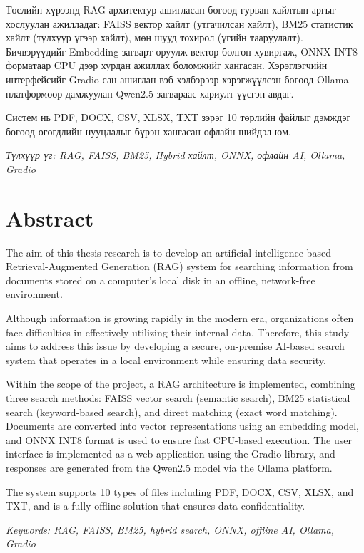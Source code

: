 \documentclass[11pt,a4paper]{article}
\begin{document}
Төслийн хүрээнд RAG архитектур ашигласан бөгөөд гурван хайлтын аргыг хослуулан ажилладаг: FAISS вектор хайлт (утгачилсан хайлт), BM25 статистик хайлт (түлхүүр үгээр хайлт), мөн шууд тохирол (үгийн тааруулалт). Бичвэрүүдийг Embedding загварт оруулж вектор болгон хувиргаж, ONNX INT8 форматаар CPU дээр хурдан ажиллах боломжийг хангасан. Хэрэглэгчийн интерфейсийг Gradio сан ашиглан вэб хэлбэрээр хэрэгжүүлсэн бөгөөд Ollama платформоор дамжуулан Qwen2.5 загвараас хариулт үүсгэн авдаг.

Систем нь PDF, DOCX, CSV, XLSX, TXT зэрэг 10 төрлийн файлыг дэмждэг бөгөөд өгөгдлийн нууцлалыг бүрэн хангасан офлайн шийдэл юм.

\textit{Түлхүүр үг: RAG, FAISS, BM25, Hybrid хайлт, ONNX, офлайн AI, Ollama, Gradio}

\newpage
\section*{Abstract}

The aim of this thesis research is to develop an artificial intelligence-based Retrieval-Augmented Generation (RAG) system for searching information from documents stored on a computer's local disk in an offline, network-free environment.

Although information is growing rapidly in the modern era, organizations often face difficulties in effectively utilizing their internal data. Therefore, this study aims to address this issue by developing a secure, on-premise AI-based search system that operates in a local environment while ensuring data security.

Within the scope of the project, a RAG architecture is implemented, combining three search methods: FAISS vector search (semantic search), BM25 statistical search (keyword-based search), and direct matching (exact word matching). Documents are converted into vector representations using an embedding model, and ONNX INT8 format is used to ensure fast CPU-based execution. The user interface is implemented as a web application using the Gradio library, and responses are generated from the Qwen2.5 model via the Ollama platform.

The system supports 10 types of files including PDF, DOCX, CSV, XLSX, and TXT, and is a fully offline solution that ensures data confidentiality.

\textit{Keywords: RAG, FAISS, BM25, hybrid search, ONNX, offline AI, Ollama, Gradio}
\end{document}
